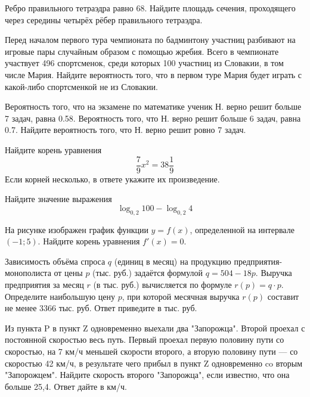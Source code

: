 \documentclass[twocolumn]{article}
\begin{document}
\begin{taskBN}{2}
Ребро правильного тетраэдра равно 68. Найдите площадь сечения, проходящего через середины четырёх рёбер правильного тетраэдра.
\end{taskBN}

\begin{taskBN}{3}
Перед началом первого тура чемпионата по бадминтону участниц разбивают на игровые пары случайным образом с помощью жребия. Всего в чемпионате участвует 496 спортсменок, среди которых 100 участниц из Словакии, в том числе Мария. Найдите вероятность того, что в первом туре Мария будет играть с какой-либо спортсменкой не из Словакии.
\end{taskBN}

\begin{taskBN}{4}
Вероятность того, что на экзамене по математике ученик Н. верно решит больше 7 задач, равна 0.58. Вероятность того, что Н. верно решит больше 6 задач, равна 0.7. Найдите вероятность того, что Н. верно решит ровно 7 задач.
\end{taskBN}

\begin{taskBN}{5}
Найдите корень уравнения $$\frac{7}{9}x^2={38}\frac{1}{9}$$ Если корней несколько, в ответе укажите их произведение.
\end{taskBN}

\begin{taskBN}{6}
Найдите значение выражения $$\log_{0,2}{100} - \log_{0,2}{4} $$
\end{taskBN}

\begin{taskBN}{7}
На рисунке изображен график функции $y = f(x)$, определенной на интервале $(-1; 5)$. Найдите корень уравнения $f'(x)=0$.\vspace{2.5cm}
\end{taskBN}

\begin{taskBN}{8}
Зависимость объёма спроса $q$ (единиц в месяц) на продукцию предприятия-монополиста от цены $p$ (тыс. руб.) задаётся формулой $q=504-18p$. Выручка предприятия за месяц $r$ (в тыс. руб.) вычисляется по формуле $r(p)=q\cdot p$. Определите наибольшую цену $p$, при которой месячная выручка $r(p)$ составит не менее 3366 тыс. руб. Ответ приведите в тыс. руб.
\end{taskBN}

\begin{taskBN}{9}
Из пункта P в пункт Z одновременно выехали два "Запорожца". Второй проехал с постоянной скоростью весь путь. Первый проехал первую половину пути со скоростью, на 7 км/ч меньшей скорости второго, а вторую половину пути — со скоростью 42 км/ч, в результате чего прибыл в пункт Z одновременно co вторым "Запорожцем". Найдите скорость второго "Запорожца", если известно, что она больше 25,4. Ответ дайте в км/ч.
\end{taskBN}
\end{document}
